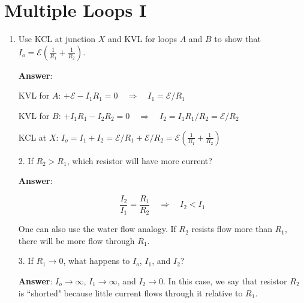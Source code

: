 \documentclass{article}
\begin{document}
\ifsolutions

\else

\newpage
\fi

\section{Multiple Loops I}



\begin{enumerate}

  \item Use KCL at junction $X$ and KVL for loops $A$ and $B$ to show that $I_o=\mathcal{E}\left(\frac{1}{R_1}+\frac{1}{R_2}\right)$.

        \ifsolutions
        \textbf{Answer}:

        KVL for $A$: $+\mathcal{E}-I_1R_1=0\quad\Rightarrow\quad I_1=\mathcal{E}/R_1$

        KVL for $B$: $+I_1R_1-I_2R_2=0 \quad\Rightarrow\quad I_2 = I_1 R_1/R_2 = \mathcal{E}/R_2$

        KCL at $X$: $I_o=I_1+I_2 = \mathcal{E}/R_1 + \mathcal{E}/R_2 = \mathcal{E}\left(\frac{1}{R_1}+\frac{1}{R_2}\right)$
        \else
        \vskip 120pt
        \fi

\end{enumerate}

\begin{enumerate}

  \item[2.] If $R_2 > R_1$, which resistor will have more current?

            \ifsolutions
            \textbf{Answer}:

            $$\frac{I_2}{I_1} = \frac{R_1}{R_2} \quad \Rightarrow \quad I_2 < I_1$$ 

            One can also use the water flow analogy. If $R_2$ resists flow more than $R_1$, there will be more flow through $R_1$.
            \else
            \vskip 60pt
            \fi

  \item[3.] If $R_1 \rightarrow 0$, what happens to $I_o$, $I_1$, and $I_2$?

            \ifsolutions
            \textbf{Answer}: $I_o \rightarrow \infty$, $I_1 \rightarrow \infty$, and $I_2\rightarrow 0$. In this case, we say that resistor $R_2$ is ``shorted" because little current flows through it relative to $R_1$.
            \else

            \newpage
            \fi

\end{enumerate}
\end{document}
